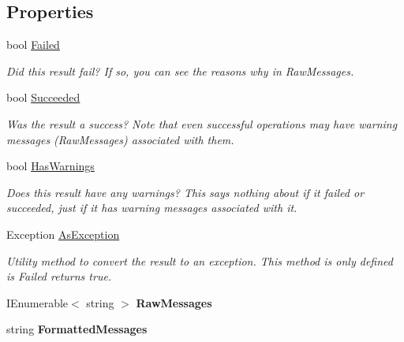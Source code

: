 \subsection*{Properties}
\begin{DoxyCompactItemize}
\item 
bool \hyperlink{struct_full_serializer_1_1fs_result_ac6770cd3b068004050fc45f82736564c}{Failed}
\begin{DoxyCompactList}\small\item\em Did this result fail? If so, you can see the reasons why in {\ttfamily Raw\+Messages}. \end{DoxyCompactList}\item 
bool \hyperlink{struct_full_serializer_1_1fs_result_a09d500a429685b79bec14453423af551}{Succeeded}
\begin{DoxyCompactList}\small\item\em Was the result a success? Note that even successful operations may have warning messages ({\ttfamily Raw\+Messages}) associated with them. \end{DoxyCompactList}\item 
bool \hyperlink{struct_full_serializer_1_1fs_result_a44ec04b6b1e0834f87fd82a10b120f71}{Has\+Warnings}
\begin{DoxyCompactList}\small\item\em Does this result have any warnings? This says nothing about if it failed or succeeded, just if it has warning messages associated with it. \end{DoxyCompactList}\item 
Exception \hyperlink{struct_full_serializer_1_1fs_result_a9bde651297a47eb80ca1e6d14d3647f2}{As\+Exception}
\begin{DoxyCompactList}\small\item\em Utility method to convert the result to an exception. This method is only defined is {\ttfamily Failed} returns true. \end{DoxyCompactList}\item 
\mbox{\label{struct_full_serializer_1_1fs_result_aaeea44c75b0b24e759e6e46c7259eab1}} 
I\+Enumerable$<$ string $>$ {\bfseries Raw\+Messages}
\item 
\mbox{\label{struct_full_serializer_1_1fs_result_a4930e1ef04bc46c9b31b324bb130e251}} 
string {\bfseries Formatted\+Messages}
\end{DoxyCompactItemize}


